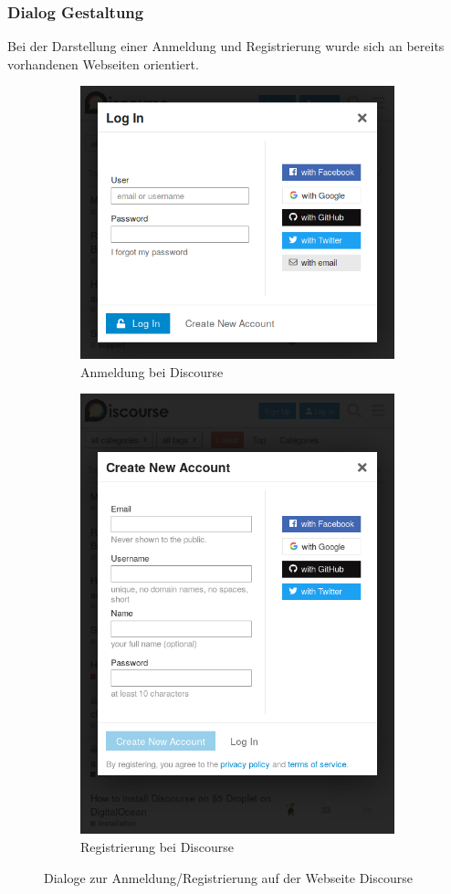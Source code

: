 \subsubsection{Dialog Gestaltung}
Bei der Darstellung einer Anmeldung und Registrierung wurde sich an bereits vorhandenen Webseiten orientiert.

\begin{figure}[h]
	\centering
	\begin{subfigure}{.5\textwidth}
		\includegraphics[width=.95\linewidth]{graphics/discourse-sign-in.png}
		\caption{Anmeldung bei Discourse}
		\label{fig:discourse-sign-in}
	\end{subfigure}%
	\begin{subfigure}{.5\textwidth}
		\centering
		\includegraphics[width=.59\linewidth]{graphics/discourse-sign-up.png}
		\caption{Registrierung bei Discourse}
		\label{fig:discourse-sign-up}
	\end{subfigure}
	\caption{Dialoge zur Anmeldung/Registrierung auf der Webseite Discourse}
	\label{fig:discourse}
\end{figure}

